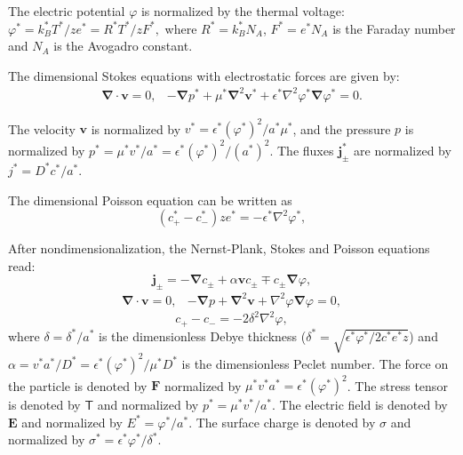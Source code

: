 \documentclass[MSc,beforeExam]{iitcsthesis}
\newcommand\eps \epsilon
\newcommand\Laplacian{\nabla^2}
\newcommand\bnabla{\boldsymbol{\nabla}}
\newcommand\bLaplacian{\boldsymbol{\nabla}^2}
\newcommand\bv{\boldsymbol{v}}
\newcommand\bE{\boldsymbol{E}}
\newcommand\bj{\boldsymbol{j}}
\newcommand\bF{\boldsymbol{F}}
\newcommand\tT{\mathsf{T}}
\begin{document}
The electric potential $\varphi$ is normalized by the thermal voltage:
$\varphi^* = {k_B^* T^*}/{z e^*} = {R^* T^*}/{z F^*},$
where $R^* = k_B^* N_A$, $F^* = e^* N_A$ is the Faraday number and $N_A$ is the Avogadro constant.

The dimensional Stokes equations with electrostatic forces are given by:
\begin{equation} \begin{array}{cc}
\bnabla \cdot \bv = 0, &
-\bnabla p^* + \mu^* \bLaplacian \bv^* + \eps^* \Laplacian \varphi^* 
\bnabla \varphi^* = 0.
\end{array}\end{equation}

The velocity $\bv$ is normalized by $v^* = {\eps^* (\varphi^*)^2}/{a^* \mu^*}$,
and the pressure $p$ is normalized by $p^* = {\mu^* v^*}/{a^*} = {\eps^* (\varphi^*)^2}/{(a^*)^2}$.
The fluxes $\bj^*_\pm$ are normalized by $j^* = {D^* c^*}/{a^*}$.

The dimensional Poisson equation can be written as
\begin{equation}
(c^*_+ - c^*_-) z e^* = -\eps^* \Laplacian \varphi^*,
\end{equation}

After nondimensionalization, the Nernst-Plank, Stokes and Poisson equations read:
\begin{equation} \label{eq:nernst}
\bj_\pm = 
-\bnabla c_\pm + \alpha \bv c_\pm \mp c_\pm \bnabla \varphi,
\end{equation}
\begin{equation} \label{eq:stokes}
\begin{array}{cc}
\bnabla \cdot \bv = 0, &
-\bnabla p + \bLaplacian \bv + \Laplacian \varphi \bnabla \varphi = 0, 
\end{array}
\end{equation}
\begin{equation} \label{eq:poisson}
c_+ - c_- = -2\delta^2 \Laplacian \varphi,
\end{equation}
where $\delta = {\delta^*}/{a^*}$ is the dimensionless Debye thickness 
($\delta^* = \sqrt{{\eps^* \varphi^*}/{2 c^* e^* z}}$) and 
$\alpha = {v^* a^*}/{D^*} = {\eps^* (\varphi^*)^2}/{\mu^* D^*}$ 
is the dimensionless Peclet number.
The force on the particle is denoted by $\bF$ normalized by $\mu^* v^* a^* = \eps^* (\varphi^*)^2$.
The stress tensor is denoted by $\tT$ and normalized by $p^* = \mu^* v^* / a^*$.
The electric field is denoted by $\bE$ and normalized by $E^* = \varphi^* / a^*$.
The surface charge is denoted by $\sigma$ and normalized by $\sigma^* = \eps^* \varphi^* / \delta^*$.
\end{document}
